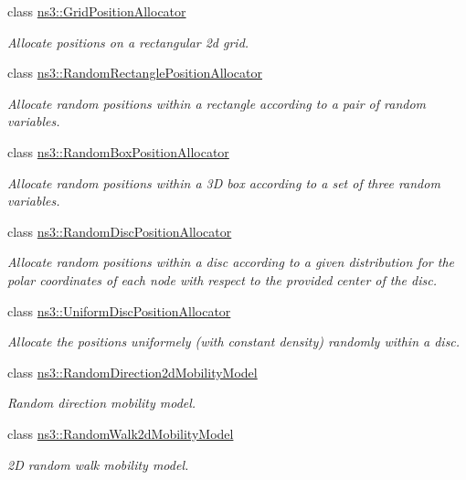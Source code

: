 \begin{DoxyCompactItemize}
class \hyperlink{classns3_1_1GridPositionAllocator}{ns3\+::\+Grid\+Position\+Allocator}
\begin{DoxyCompactList}\small\item\em Allocate positions on a rectangular 2d grid. \end{DoxyCompactList}\item 
class \hyperlink{classns3_1_1RandomRectanglePositionAllocator}{ns3\+::\+Random\+Rectangle\+Position\+Allocator}
\begin{DoxyCompactList}\small\item\em Allocate random positions within a rectangle according to a pair of random variables. \end{DoxyCompactList}\item 
class \hyperlink{classns3_1_1RandomBoxPositionAllocator}{ns3\+::\+Random\+Box\+Position\+Allocator}
\begin{DoxyCompactList}\small\item\em Allocate random positions within a 3D box according to a set of three random variables. \end{DoxyCompactList}\item 
class \hyperlink{classns3_1_1RandomDiscPositionAllocator}{ns3\+::\+Random\+Disc\+Position\+Allocator}
\begin{DoxyCompactList}\small\item\em Allocate random positions within a disc according to a given distribution for the polar coordinates of each node with respect to the provided center of the disc. \end{DoxyCompactList}\item 
class \hyperlink{classns3_1_1UniformDiscPositionAllocator}{ns3\+::\+Uniform\+Disc\+Position\+Allocator}
\begin{DoxyCompactList}\small\item\em Allocate the positions uniformely (with constant density) randomly within a disc. \end{DoxyCompactList}\item 
class \hyperlink{classns3_1_1RandomDirection2dMobilityModel}{ns3\+::\+Random\+Direction2d\+Mobility\+Model}
\begin{DoxyCompactList}\small\item\em Random direction mobility model. \end{DoxyCompactList}\item 
class \hyperlink{classns3_1_1RandomWalk2dMobilityModel}{ns3\+::\+Random\+Walk2d\+Mobility\+Model}
\begin{DoxyCompactList}\small\item\em 2D random walk mobility model. \end{DoxyCompactList}\item 

\end{DoxyCompactItemize}
